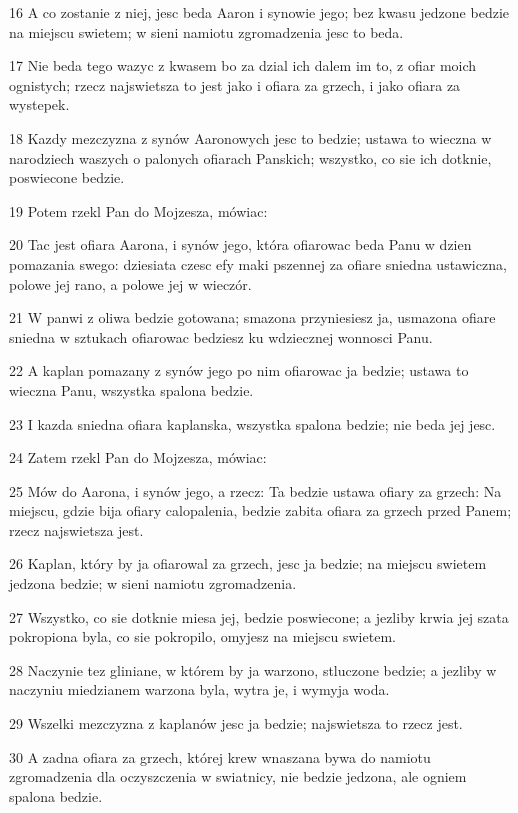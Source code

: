 \par 16 A co zostanie z niej, jesc beda Aaron i synowie jego; bez kwasu jedzone bedzie na miejscu swietem; w sieni namiotu zgromadzenia jesc to beda.
\par 17 Nie beda tego wazyc z kwasem bo za dzial ich dalem im to, z ofiar moich ognistych; rzecz najswietsza to jest jako i ofiara za grzech, i jako ofiara za wystepek.
\par 18 Kazdy mezczyzna z synów Aaronowych jesc to bedzie; ustawa to wieczna w narodziech waszych o palonych ofiarach Panskich; wszystko, co sie ich dotknie, poswiecone bedzie.
\par 19 Potem rzekl Pan do Mojzesza, mówiac:
\par 20 Tac jest ofiara Aarona, i synów jego, która ofiarowac beda Panu w dzien pomazania swego: dziesiata czesc efy maki pszennej za ofiare sniedna ustawiczna, polowe jej rano, a polowe jej w wieczór.
\par 21 W panwi z oliwa bedzie gotowana; smazona przyniesiesz ja, usmazona ofiare sniedna w sztukach ofiarowac bedziesz ku wdziecznej wonnosci Panu.
\par 22 A kaplan pomazany z synów jego po nim ofiarowac ja bedzie; ustawa to wieczna Panu, wszystka spalona bedzie.
\par 23 I kazda sniedna ofiara kaplanska, wszystka spalona bedzie; nie beda jej jesc.
\par 24 Zatem rzekl Pan do Mojzesza, mówiac:
\par 25 Mów do Aarona, i synów jego, a rzecz: Ta bedzie ustawa ofiary za grzech: Na miejscu, gdzie bija ofiary calopalenia, bedzie zabita ofiara za grzech przed Panem; rzecz najswietsza jest.
\par 26 Kaplan, który by ja ofiarowal za grzech, jesc ja bedzie; na miejscu swietem jedzona bedzie; w sieni namiotu zgromadzenia.
\par 27 Wszystko, co sie dotknie miesa jej, bedzie poswiecone; a jezliby krwia jej szata pokropiona byla, co sie pokropilo, omyjesz na miejscu swietem.
\par 28 Naczynie tez gliniane, w którem by ja warzono, stluczone bedzie; a jezliby w naczyniu miedzianem warzona byla, wytra je, i wymyja woda.
\par 29 Wszelki mezczyzna z kaplanów jesc ja bedzie; najswietsza to rzecz jest.
\par 30 A zadna ofiara za grzech, której krew wnaszana bywa do namiotu zgromadzenia dla oczyszczenia w swiatnicy, nie bedzie jedzona, ale ogniem spalona bedzie.

